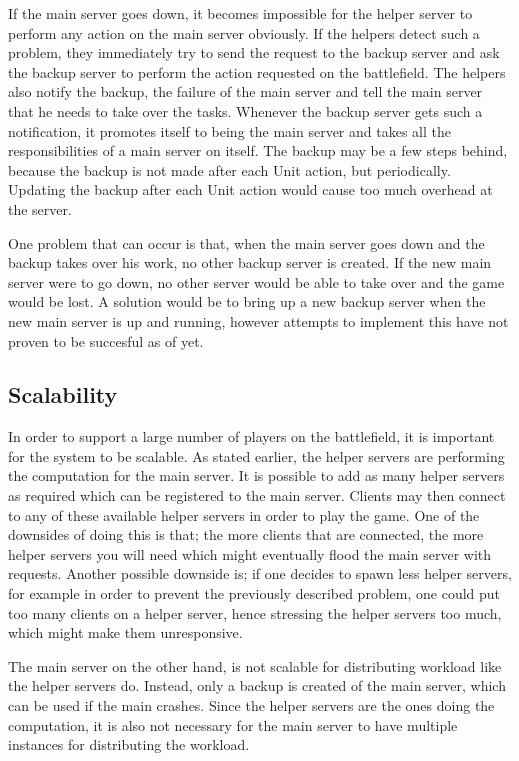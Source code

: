 If the main server goes down, it becomes impossible for the helper server to perform any action on the main server obviously.
If the helpers detect such a problem, they immediately try to send the request to the backup server and ask the backup server to perform the action requested on the battlefield.
The helpers also notify the backup, the failure of the main server and tell the main server that he needs to take over the tasks.
Whenever the backup server gets such a notification, it promotes itself to being the main server and takes all the responsibilities of a main server on itself.
The backup may be a few steps behind, because the backup is not made after each Unit action, but periodically. 
Updating the backup after each Unit action would cause too much overhead at the server. 

One problem that can occur is that, when the main server goes down and the backup takes over his work, no other backup server is created. 
If the new main server were to go down, no other server would be able to take over and the game would be lost. 
A solution would be to bring up a new backup server when the new main server is up and running, however attempts to implement this have not proven to be succesful as of yet.

\subsection{Scalability}
In order to support a large number of players on the battlefield, it is important for the system to be scalable.
As stated earlier, the helper servers are performing the computation for the main server.
It is possible to add as many helper servers as required which can be registered to the main server.
Clients may then connect to any of these available helper servers in order to play the game. One of the downsides of doing this is that; the more clients that are connected, the more helper servers you will need which might eventually flood the main server with requests. Another possible downside is; if one decides to spawn less helper servers, for example in order to prevent the previously described problem, one could put too many clients on a helper server, hence stressing the helper servers too much, which might make them unresponsive.

The main server on the other hand, is not scalable for distributing workload like the helper servers do. 
Instead, only a backup is created of the main server, which can be used if the main crashes.
Since the helper servers are the ones doing the computation, it is also not necessary for the main server to have multiple instances for distributing the workload.
 
